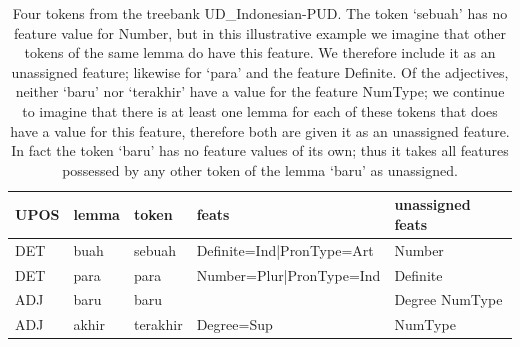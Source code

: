 \documentclass[USenglish]{article}
\begin{document}
\begin{enumerate}
\end{enumerate}

\begin{table}[h]
    \centering
    \caption{Four tokens from the treebank UD\_Indonesian-PUD. The token `sebuah' has no feature value for Number, but in this illustrative example we imagine that other tokens of the same lemma do have this feature. We therefore include it as an unassigned feature; likewise for `para' and the feature Definite. Of the adjectives, neither `baru' nor `terakhir' have a value for the feature NumType; we continue to imagine that there is at least one lemma for each of these tokens that does have a value for this feature, therefore both are given it as an unassigned feature. In fact the token `baru' has no feature values of its own; thus it takes all features possessed by any other token of the lemma `baru' as unassigned.} %
    \label{tab:unassigned_ex}   
    \begin{tabular}{p{1cm}p{1.4cm}p{1.5cm}p{3.5cm}p{2.5cm}}
\toprule

UPOS&lemma	&token	&feats & unassigned feats	\\ 
\midrule
DET & buah & sebuah 
& Definite=Ind|PronType=Art
& Number
\\\midrule
DET & para	& para	&Number=Plur|PronType=Ind & Definite
\\\midrule
ADJ&baru	&baru&
& Degree \newline
NumType 
\\\midrule
ADJ & akhir	&terakhir&	Degree=Sup& NumType\\\bottomrule
\end{tabular}
\end{table}
\end{document}
